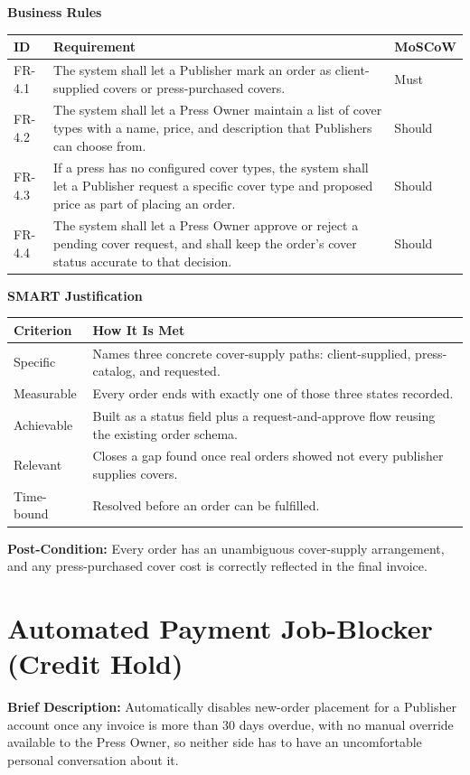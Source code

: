 \documentclass{scrreprt}
\begin{document}
\textbf{Business Rules}
\begin{longtable}{p{} L{0.76\textwidth} p{0.12\textwidth}}
\toprule
{} \textbf{ID} & \textbf{Requirement} & \textbf{MoSCoW} \\
\midrule
\endhead
FR-4.1 & The system shall let a Publisher mark an order as client-supplied covers or press-purchased covers. & Must \\
FR-4.2 & The system shall let a Press Owner maintain a list of cover types with a name, price, and description that Publishers can choose from. & Should \\
FR-4.3 & If a press has no configured cover types, the system shall let a Publisher request a specific cover type and proposed price as part of placing an order. & Should \\
FR-4.4 & The system shall let a Press Owner approve or reject a pending cover request, and shall keep the order's cover status accurate to that decision. & Should \\
\bottomrule
\end{longtable}

\textbf{SMART Justification}
\begin{longtable}{p{} L{0.82\textwidth}}
\toprule
{} \textbf{Criterion} & \textbf{How It Is Met} \\
\midrule
\endhead
Specific & Names three concrete cover-supply paths: client-supplied, press-catalog, and requested. \\
Measurable & Every order ends with exactly one of those three states recorded. \\
Achievable & Built as a status field plus a request-and-approve flow reusing the existing order schema. \\
Relevant & Closes a gap found once real orders showed not every publisher supplies covers. \\
Time-bound & Resolved before an order can be fulfilled. \\
\bottomrule
\end{longtable}

\textbf{Post-Condition:} Every order has an unambiguous cover-supply arrangement, and any press-purchased cover cost is correctly reflected in the final invoice.

\section{Automated Payment Job-Blocker (Credit Hold)}
\textbf{Brief Description:} Automatically disables new-order placement for a Publisher account once any invoice is more than 30 days overdue, with no manual override available to the Press Owner, so neither side has to have an uncomfortable personal conversation about it.
\end{document}
